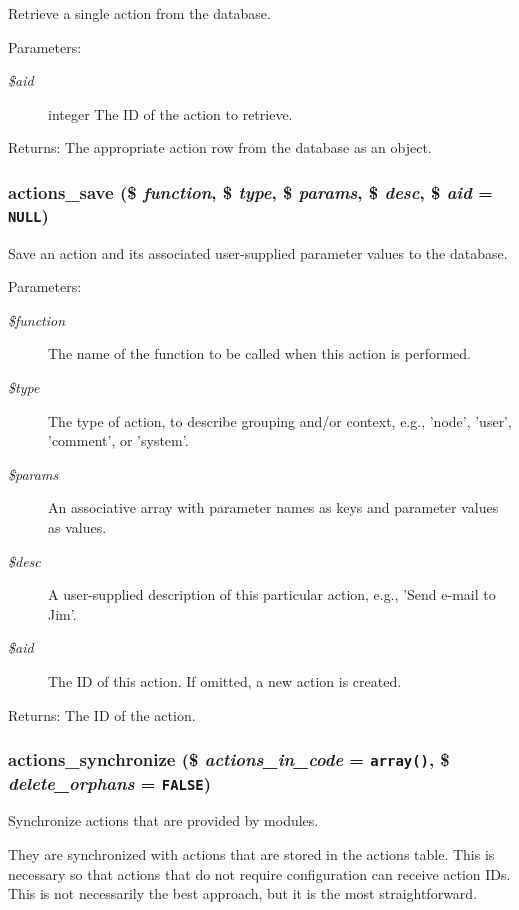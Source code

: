 Retrieve a single action from the database.

\begin{Desc}
\item[Parameters:]
\begin{description}
\item[{\em \$aid}]integer The ID of the action to retrieve.\end{description}
\end{Desc}
\begin{Desc}
\item[Returns:]The appropriate action row from the database as an object. \end{Desc}
\hypertarget{actions_8inc_58e2d372003a208c732f98cfb00b1c98}{
\subsubsection[{actions\_\-save}]{\setlength{\rightskip}{0pt plus 5cm}actions\_\-save (\$ {\em function}, \/  \$ {\em type}, \/  \$ {\em params}, \/  \$ {\em desc}, \/  \$ {\em aid} = {\tt NULL})}}
\label{actions_8inc_58e2d372003a208c732f98cfb00b1c98}


Save an action and its associated user-supplied parameter values to the database.

\begin{Desc}
\item[Parameters:]
\begin{description}
\item[{\em \$function}]The name of the function to be called when this action is performed. \item[{\em \$type}]The type of action, to describe grouping and/or context, e.g., 'node', 'user', 'comment', or 'system'. \item[{\em \$params}]An associative array with parameter names as keys and parameter values as values. \item[{\em \$desc}]A user-supplied description of this particular action, e.g., 'Send e-mail to Jim'. \item[{\em \$aid}]The ID of this action. If omitted, a new action is created.\end{description}
\end{Desc}
\begin{Desc}
\item[Returns:]The ID of the action. \end{Desc}
\hypertarget{actions_8inc_a4445cbadb5d03206c4a724581b2b30c}{
\subsubsection[{actions\_\-synchronize}]{\setlength{\rightskip}{0pt plus 5cm}actions\_\-synchronize (\$ {\em actions\_\-in\_\-code} = {\tt array()}, \/  \$ {\em delete\_\-orphans} = {\tt FALSE})}}
\label{actions_8inc_a4445cbadb5d03206c4a724581b2b30c}


Synchronize actions that are provided by modules.

They are synchronized with actions that are stored in the actions table. This is necessary so that actions that do not require configuration can receive action IDs. This is not necessarily the best approach, but it is the most straightforward. 